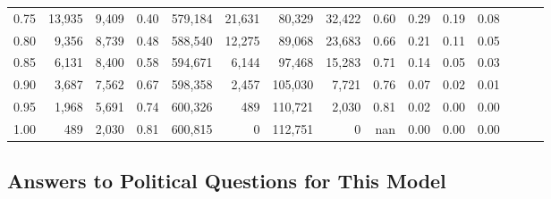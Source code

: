 \begin{tabular}{rrrrrrrrrrrrrrr}
0.75 &  13,935 &   9,409 &  0.40 &  579,184 &   21,631 &   80,329 &   32,422 &  0.60 &  0.29 &  0.19 &      0.08 \\
0.80 &   9,356 &   8,739 &  0.48 &  588,540 &   12,275 &   89,068 &   23,683 &  0.66 &  0.21 &  0.11 &      0.05 \\
0.85 &   6,131 &   8,400 &  0.58 &  594,671 &    6,144 &   97,468 &   15,283 &  0.71 &  0.14 &  0.05 &      0.03 \\
0.90 &   3,687 &   7,562 &  0.67 &  598,358 &    2,457 &  105,030 &    7,721 &  0.76 &  0.07 &  0.02 &      0.01 \\
0.95 &   1,968 &   5,691 &  0.74 &  600,326 &      489 &  110,721 &    2,030 &  0.81 &  0.02 &  0.00 &      0.00 \\
1.00 &     489 &   2,030 &  0.81 &  600,815 &        0 &  112,751 &        0 &   nan &  0.00 &  0.00 &      0.00 \\
\bottomrule
\end{tabular}

\subsection{Answers to Political Questions for This Model}

